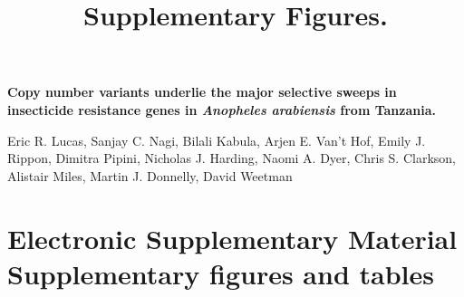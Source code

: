 \documentclass[a4paper,12pt]{article}
\title{Supplementary Figures.}
\begin{document}
\onehalfspacing

\begin{center}
	\Large
	\noindent \textbf{Copy number variants underlie the major selective sweeps in insecticide resistance genes in \textit{Anopheles arabiensis} from Tanzania.}

	\normalsize

	\vskip 3cm

\end{center}

\noindent Eric R. Lucas, Sanjay C. Nagi, Bilali Kabula, Arjen E. Van’t Hof, Emily J. Rippon, Dimitra Pipini, Nicholas J. Harding, Naomi A. Dyer, Chris S. Clarkson, Alistair Miles, Martin J. Donnelly, David Weetman
 

 
\vskip 2cm 


\section*{Electronic Supplementary Material \\ Supplementary figures and tables}

\clearpage
\end{document}
